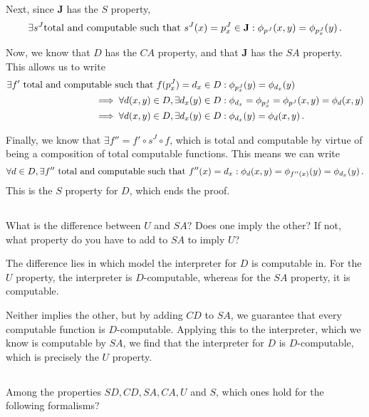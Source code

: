 \begin{solution}
\begin{enumerate}
		Next, since \(\mathbf{J}\) has the \(S\) property,
		\[
		\exists s^J \textnormal{total and computable such that } s^J(x) = p_x^J \in \mathbf{J}:
		\phi_{p^J}(x, y) = \phi_{p_x^J}(y)\,.
		\]

		Now, we know that \(D\) has the \(CA\) property,
		and that \(\mathbf{J}\) has the \(SA\) property.
		This allows us to write
		\begin{align*}
		\exists f' \textnormal{ total and computable such that } f(p_x^J) = d_x \in D &:
		\phi_{p_x^J}(y) = \phi_{d_x}(y)\\
		\implies \forall d(x, y) \in D, \exists d_x(y) \in D &: \phi_{d_x} = \phi_{p_x^J} = \phi_{p^J}(x, y) = \phi_{d}(x, y)\\
		\implies \forall d(x, y) \in D, \exists d_x(y) \in D &: \phi_{d_x}(y) = \phi_d(x, y)\,.
		\end{align*}

		Finally, we know that \(\exists f'' = f' \circ s^J \circ f\),
		which is total and computable by virtue of being
		a composition of total computable functions.
		This means we can write
		\[
		\forall d \in D, \exists f'' \textnormal{ total and computable such that } f''(x) = d_x: \phi_d(x, y) = \phi_{f''(x)}(y) = \phi_{d_x}(y)\,.
		\]
		This is the \(S\) property for \(D\),
		which ends the proof.
	\end{enumerate}
\end{solution}

\subsection{} %
What is the difference between \(U\) and \(SA\)?
Does one imply the other?
If not, what property do you have to add to \(SA\) to imply \(U\)?

\begin{solution}
	The difference lies in which model the interpreter for \(D\)
	is computable in.
	For the \(U\) property, the interpreter is \(D\)-computable,
	whereas for the \(SA\) property, it is computable.

	Neither implies the other,
	but by adding \(CD\) to \(SA\),
	we guarantee that every computable function is \(D\)-computable.
	Applying this to the interpreter, which we know is computable by \(SA\),
	we find that the interpreter for \(D\) is \(D\)-computable,
	which is precisely the \(U\) property.
\end{solution}

\subsection{} %
Among the properties \(SD, CD, SA, CA, U\) and \(S\),
which ones hold for the following formalisms?

